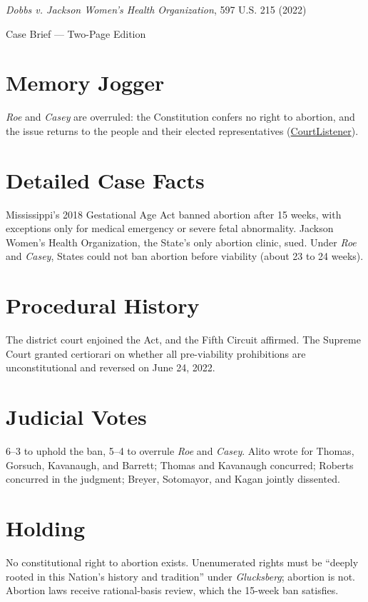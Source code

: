\documentclass[12pt]{article}
\begin{document}
\begin{center}
{\LARGE \textit{Dobbs v. Jackson Women's Health Organization}, 597 U.S. 215 (2022)\par}
\vspace{0.5em}
{\large Case Brief --- Two-Page Edition\par}
\end{center}

\section{Memory Jogger}
\textit{Roe} and \textit{Casey} are overruled: the Constitution confers no right to abortion, and the issue returns to the people and their elected representatives (\href{https://www.courtlistener.com/opinion/6481357/dobbs-v-jackson-womens-health-organization/}{CourtListener}).

\section{Detailed Case Facts}
Mississippi's 2018 Gestational Age Act banned abortion after 15 weeks, with exceptions only for medical emergency or severe fetal abnormality. Jackson Women's Health Organization, the State's only abortion clinic, sued. Under \textit{Roe} and \textit{Casey}, States could not ban abortion before viability (about 23 to 24 weeks).

\section{Procedural History}
The district court enjoined the Act, and the Fifth Circuit affirmed. The Supreme Court granted certiorari on whether all pre-viability prohibitions are unconstitutional and reversed on June 24, 2022.

\section{Judicial Votes}
6--3 to uphold the ban, 5--4 to overrule \textit{Roe} and \textit{Casey}. Alito wrote for Thomas, Gorsuch, Kavanaugh, and Barrett; Thomas and Kavanaugh concurred; Roberts concurred in the judgment; Breyer, Sotomayor, and Kagan jointly dissented.

\section{Holding}
No constitutional right to abortion exists. Unenumerated rights must be ``deeply rooted in this Nation's history and tradition'' under \textit{Glucksberg}; abortion is not. Abortion laws receive rational-basis review, which the 15-week ban satisfies.
\end{document}
